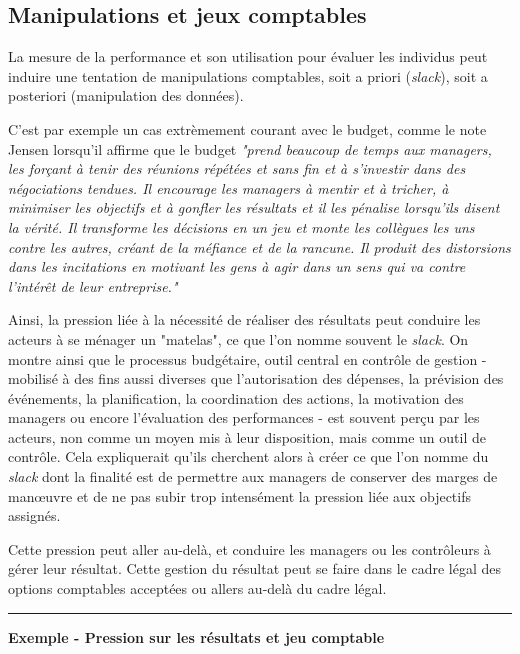 \documentclass[oneside]{kaobook}
\begin{document}
\subsection{Manipulations et jeux comptables}
\label{sec:orgf1fbf4e}
La mesure de la performance et son utilisation pour évaluer les individus peut induire une tentation de manipulations comptables, soit a priori (\emph{slack}), soit a posteriori (manipulation des données).

C'est par exemple un cas extrèmement courant avec le budget, comme le note Jensen lorsqu'il affirme que le budget \emph{"prend beaucoup de temps aux managers, les forçant à tenir des réunions répétées et sans fin et à s'investir dans des négociations tendues. Il encourage les managers à mentir et à tricher, à minimiser les objectifs et à gonfler les résultats et il les pénalise lorsqu'ils disent la vérité. Il transforme les décisions en un jeu et monte les collègues les uns contre les autres, créant de la méfiance et de la rancune. Il produit des distorsions dans les incitations en motivant les gens à agir dans un sens qui va contre l'intérêt de leur entreprise."}

Ainsi, la pression liée à la nécessité de réaliser des résultats peut conduire les acteurs à se ménager un "matelas", ce que l’on nomme souvent le \emph{slack}. On montre ainsi que le processus budgétaire, outil central en contrôle de gestion - mobilisé à des fins aussi diverses que l’autorisation des dépenses, la prévision des événements, la planification, la coordination des actions, la motivation des managers ou encore l’évaluation des performances - est souvent perçu par les acteurs, non comme un moyen mis à leur disposition, mais comme un outil de contrôle. Cela expliquerait qu’ils cherchent alors à créer ce que l’on nomme du \emph{slack} dont la finalité est de permettre aux managers de conserver des marges de manœuvre et de ne pas subir trop intensément la pression liée aux objectifs assignés.

Cette pression peut aller au-delà, et conduire les managers ou les contrôleurs à gérer leur résultat. Cette gestion du résultat peut se faire dans le cadre légal des options comptables acceptées ou allers au-delà du cadre légal.

\noindent\rule{\textwidth}{0.5pt}
\textbf{Exemple - Pression sur les résultats et jeu comptable }
\end{document}
